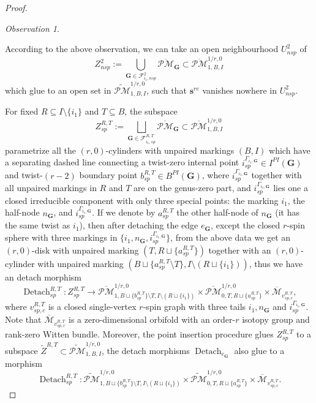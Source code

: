 \documentclass[11pt]{amsart}
\theoremstyle{definition}
\theoremstyle{remark}
\newtheorem{obs}[dummy]{Observation}
\newcommand{\oPMb}{{\overline{\mathcal{PM}}}}
\newcommand{\<}{\left<}
\renewcommand{\>}{\right>}
\numberwithin{equation}{section}
\def\Mbar{{\overline{\mathcal M}}}
\begin{document}
\begin{proof}
\begin{obs}
            
        \end{obs}

         According to the above observation, we can take an open neighbourhood $U^{2}_{nsp}$ of $$Z^2_{nsp}:=\bigcup_{\bm{G}\in \bm{\mathcal F}^2_{i_1,nsp}} \oPMb_{\bm{G}}\subset \oPMb^{1/r,0}_{1,B,I}$$ 
         which glue to an open set in $\widetilde{\mathcal{PM}}^{1/r,0}_{1,B,I}$, such that $\bm{s}^{re}$ vanishes nowhere in $U^{2}_{nsp}$. 
         
        
         
         For fixed $R\subseteq I\setminus\{i_1\}$ and $T\subseteq B$, the subspace
         $$
         Z_{sp}^{R,T}:=\bigsqcup_{\bm{G}\in \mathcal F^{R,T}_{i_1,sp}}\oPMb_{\bm{G}}\subset \oPMb_{1,B,I}^{1/r,0}
         $$
         parametrize all the $(r,0)$-cylinders with unpaired markings $(B,I)$ which have a separating dashed line connecting a twist-zero internal point $i_{sp}^{\Gamma_{i_1,\bm{G}}}\in I^{PI}(\bm{G})$ and twist-$(r-2)$ boundary point $b^{R,T}_{sp}\in B^{PI}(\bm{G})$, where $i_{sp}^{\Gamma_{i_1,\bm{G}}}$ together with all unpaired markings in $R$ and $T$ are on the genus-zero part, and  $i_{sp}^{\Gamma_{i_1,\bm{G}}}$  lies one a closed irreducible component with only three special points: the marking $i_1$, the half-node $n_{\bm{G}}$, and $i_{sp}^{\Gamma_{i_1,\bm{G}}}$. If we denote by $a^{R,T}_{sp}$ the other half-node of $n_{\bm{G}}$ (it has the same twist as $i_1$), then after detaching the edge $e_{\bm{G}}$, except the closed $r$-spin sphere with three markings in $\{i_1,n_{\bm{G}},i_{sp}^{\Gamma_{i_1,\bm{G}}}\}$, from the above data we get an $(r,0)$-disk with unpaired marking $(T,R\sqcup \{a^{R,T}_{sp}\})$ together with an $(r,0)$-cylinder with unpaired marking $(B\sqcup \{a^{R,T}_{sp} \setminus T\},I\setminus (R\sqcup \{i_1\}))$, thus we have an detach morphism
         \begin{equation}\label{eq detach sp}
         \operatorname{Detach}_{sp}^{R,T}\colon Z^{R,T}_{sp} \to \oPMb^{1/r,0}_{1,B\sqcup \{b^{R,T}_{sp}\} \setminus T,I\setminus (R\sqcup \{i_1\})} \times \oPMb^{1/r,0}_{0,T,R\sqcup \{a^{R,T}_{sp}\}}\times \Mbar_{v_{sp,c}^{R,T}},
         \end{equation}
         where $v_{sp,c}^{R,T}$ is a closed single-vertex $r$-spin graph with three tails $i_1,n_{\bm{G}}$ and $i_{sp}^{\Gamma_{i_1,\bm{G}}}$. Note that $\Mbar_{v_{sp,c}^{R,T}}$ is a zero-dimensional orbifold with an order-$r$ isotopy group and rank-zero Witten bundle.
         Moreover, the point insertion procedure glues $Z^{R,T}_{sp}$ to a subspace $\widetilde{Z}^{R,T} \subset \widetilde{\mathcal{PM}}^{1/r,0}_{1,B,I}$, the detach morphisms $\operatorname{Detach}_{e_{\bm{G}}}$ also glue to a morphism
         $$
         \operatorname{Detach}_{sp}^{R,T}\colon \widetilde{\mathcal{PM}}^{1/r,0}_{1,B\sqcup \{b^{R,T}_{sp}\} \setminus T,I\setminus (R\sqcup \{i_1\})} \times \widetilde{\mathcal{PM}}^{1/r,0}_{0,T,R\sqcup \{a^{R,T}_{sp}\}}\times \Mbar_{v_{sp,c}^{R,T}}. 
         $$


\end{proof}
\end{document}
